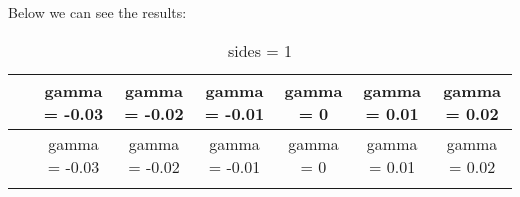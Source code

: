 \documentclass[
]{article}
\begin{document}
Below we can see the results:

\begin{longtable}[]{@{}ccccccc@{}}
\caption{sides = 1}\tabularnewline
\toprule
\begin{minipage}[b]{0.13\columnwidth}\centering
~\strut
\end{minipage} & \begin{minipage}[b]{0.12\columnwidth}\centering
gamma = -0.03\strut
\end{minipage} & \begin{minipage}[b]{0.12\columnwidth}\centering
gamma = -0.02\strut
\end{minipage} & \begin{minipage}[b]{0.12\columnwidth}\centering
gamma = -0.01\strut
\end{minipage} & \begin{minipage}[b]{0.09\columnwidth}\centering
gamma = 0\strut
\end{minipage} & \begin{minipage}[b]{0.11\columnwidth}\centering
gamma = 0.01\strut
\end{minipage} & \begin{minipage}[b]{0.11\columnwidth}\centering
gamma = 0.02\strut
\end{minipage}\tabularnewline
\midrule
\endfirsthead
\toprule
\begin{minipage}[b]{0.13\columnwidth}\centering
~\strut
\end{minipage} & \begin{minipage}[b]{0.12\columnwidth}\centering
gamma = -0.03\strut
\end{minipage} & \begin{minipage}[b]{0.12\columnwidth}\centering
gamma = -0.02\strut
\end{minipage} & \begin{minipage}[b]{0.12\columnwidth}\centering
gamma = -0.01\strut
\end{minipage} & \begin{minipage}[b]{0.09\columnwidth}\centering
gamma = 0\strut
\end{minipage} & \begin{minipage}[b]{0.11\columnwidth}\centering
gamma = 0.01\strut
\end{minipage} & \begin{minipage}[b]{0.11\columnwidth}\centering
gamma = 0.02\strut
\end{minipage}\tabularnewline
\midrule
\endhead
\begin{minipage}[t]{0.13\columnwidth}\centering

\end{minipage}
\end{longtable}
\end{document}
